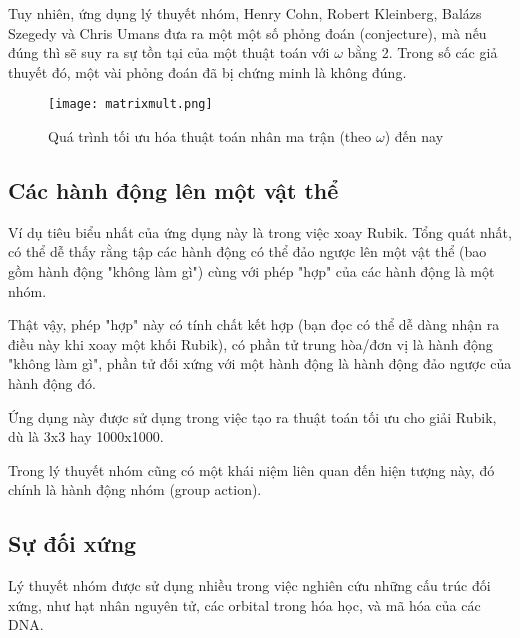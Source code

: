 Tuy nhiên, ứng dụng lý thuyết nhóm, Henry Cohn, Robert Kleinberg, Balázs Szegedy và Chris Umans đưa ra một một số phỏng đoán (conjecture), mà nếu đúng thì sẽ suy ra sự tồn tại của một thuật toán với $\omega$ bằng 2. Trong số các giả thuyết đó, một vài phỏng đoán đã bị chứng minh là không đúng.

\newpage
\begin{figure}
	\centering
	\texttt{[image: matrixmult.png]}
	\caption{Quá trình tối ưu hóa thuật toán nhân ma trận (theo $\omega$) đến nay}
\end{figure}

\subsection{Các hành động lên một vật thể}

Ví dụ tiêu biểu nhất của ứng dụng này là trong việc xoay Rubik. Tổng quát nhất, có thể dễ thấy rằng tập các hành động có thể đảo ngược lên một vật thể (bao gồm hành động "không làm gì") cùng với phép "hợp" của các hành động là một nhóm.

Thật vậy, phép "hợp" này có tính chất kết hợp (bạn đọc có thể dễ dàng nhận ra điều này khi xoay một khối Rubik), có phần tử trung hòa/đơn vị là hành động "không làm gì", phần tử đối xứng với một hành động là hành động đảo ngược của hành động đó.

Ứng dụng này được sử dụng trong việc tạo ra thuật toán tối ưu cho giải Rubik, dù là 3x3 hay 1000x1000. 

Trong lý thuyết nhóm cũng có một khái niệm liên quan đến hiện tượng này, đó chính là hành động nhóm (group action).

\subsection{Sự đối xứng}

Lý thuyết nhóm được sử dụng nhiều trong việc nghiên cứu những cấu trúc đối xứng, như hạt nhân nguyên tử, các orbital trong hóa học, và mã hóa của các DNA.